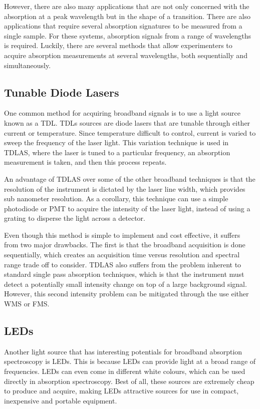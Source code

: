 However, there are also many applications that are not only concerned with the
absorption at a peak wavelength but in the shape of a transition. There are
also applications that require several absorption signatures to be measured
from a single sample. For these systems, absorption signals from a range of
wavelengths is required. Luckily, there are several methods that allow
experimenters to acquire absorption measurements at several wavelengths, both
sequentially and simultaneously.


\subsection{Tunable Diode Lasers}

One common method for acquiring broadband signals is to use a light source
known as a \acf{TDL}. \acp{TDL} sources are diode lasers that are tunable
through either current or temperature. Since temperature difficult to control,
current is varied to sweep the frequency of the laser light. This variation
technique is used in \ac{TDLAS}, where the laser is tuned to a particular
frequency, an absorption measurement is taken, and then this process repeats.

An advantage of \ac{TDLAS} over some of the other broadband techniques is that
the resolution of the instrument is dictated by the laser line width, which
provides sub nanometer resolution. As a corollary, this technique can use a
simple photodiode or \ac{PMT} to acquire the intensity of the laser light,
instead of using a grating to disperse the light across a detector.

Even though this method is simple to implement and cost effective, it suffers
from two major drawbacks. The first is that the broadband acquisition is done
sequentially, which creates an acquisition time versus resolution and spectral
range trade off to consider. \ac{TDLAS} also suffers from the problem inherent
to standard single pass absorption techniques, which is that the instrument
must detect a potentially small intensity change on top of a large background
signal. However, this second intensity problem can be mitigated through the use
either \ac{WMS} or \ac{FMS}.

\subsection{LEDs}

Another light source that has interesting potentials for broadband absorption
spectroscopy is \acp{LED}. This is because \acp{LED} can provide light at a
broad range of frequencies. \acp{LED} can even come in different white colours,
which can be used directly in absorption spectroscopy. Best of all, these
sources are extremely cheap to produce and acquire, making \acp{LED} attractive
sources for use in compact, inexpensive and portable equipment.

